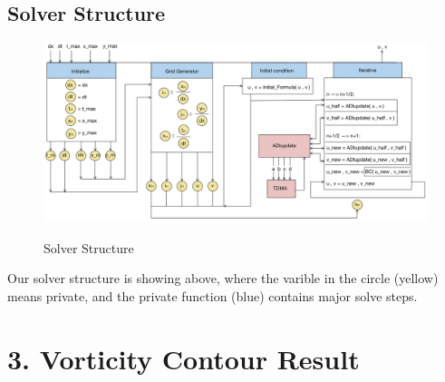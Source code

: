 \documentclass[12pt]{article}
\begin{document}
\subsection{Solver Structure}



\begin{figure}[H]
    \centering
    \includegraphics[width=1\textwidth]{figuresGeneral/Solver_Structure.jpg}
    \label{IGs.jpg}
    \caption{Solver Structure }
\end{figure}

Our solver structure is showing above, where the varible
in the circle (yellow) means private, and the private function
(blue) contains major solve steps.














\newpage

\section{3. Vorticity Contour Result}
\end{document}
